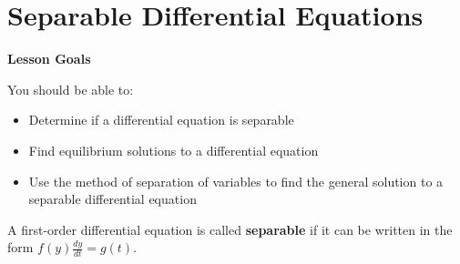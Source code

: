 \documentclass[main]{subfiles}
\begin{document}
\section{Separable Differential Equations} \label{ws3-4}

\begin{framed}
\centerline{\textbf{Lesson Goals}}

You should be able to:
\begin{itemize}
\item Determine if a differential equation is separable
\item Find equilibrium solutions to a differential equation
\item Use the method of separation of variables to find the general solution to a separable differential equation


\end{itemize}
\end{framed}

  \begin{problemonly}
    \begin{framed}
    A first-order differential equation is called {\bf separable}
    if it can be written in the form $f(y) \frac{dy}{dt} = g(t)$.  
    \end{framed}
  \end{problemonly}  
\end{document}
